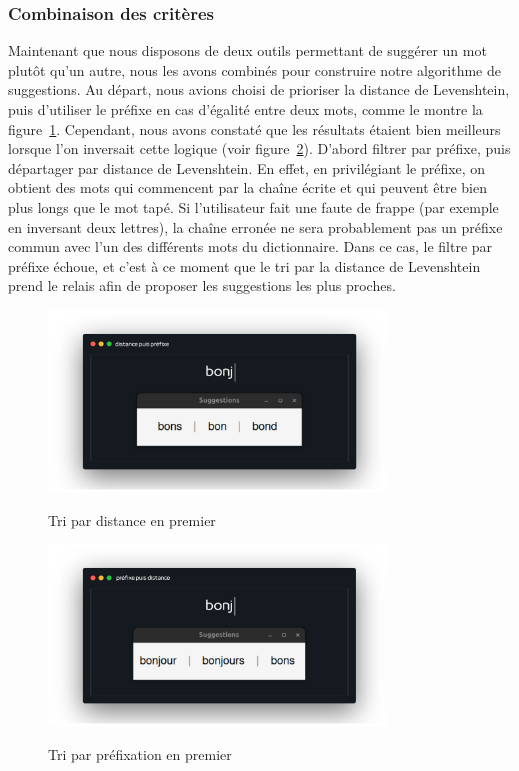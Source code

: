 \documentclass[a4paper, 11pt]{report}
\begin{document}
{\subsubsection{Combinaison des critères}
Maintenant que nous disposons de deux outils permettant de suggérer un mot plutôt qu’un autre, nous les avons combinés pour construire notre algorithme de suggestions. Au départ, nous avions choisi de prioriser la distance de Levenshtein, puis d'utiliser le préfixe en cas d’égalité entre deux mots, comme le montre la figure~\ref{fig:tri_dist}. Cependant, nous avons constaté que les résultats étaient bien meilleurs lorsque l’on inversait cette logique (voir figure~\ref{fig:tri_prefixe}). D'abord filtrer par préfixe, puis départager par distance de Levenshtein. En effet, en privilégiant le préfixe, on obtient des mots qui commencent par la chaîne écrite et qui peuvent être bien plus longs que le mot tapé. Si l'utilisateur fait une faute de frappe (par exemple en inversant deux lettres), la chaîne erronée ne sera probablement pas un préfixe commun avec l'un des différents mots du dictionnaire. Dans ce cas, le filtre par préfixe échoue, et c'est à ce moment que le tri par la distance de Levenshtein prend le relais afin de proposer les suggestions les plus proches.\\

\begin{figure}[H]
	\begin{center}
		{\includegraphics[width=0.8\textwidth]{images/sugg_distance.png}}
	\end{center}
	\caption{Tri par distance en premier}
	\label{fig:tri_dist}
\end{figure}
\begin{figure}[H]
	\begin{center}
		{\includegraphics[width=0.8\textwidth]{images/sugg_prefixe.png}}
	\end{center}
	\caption{Tri par préfixation en premier}
	\label{fig:tri_prefixe}
\end{figure}

}
\end{document}

